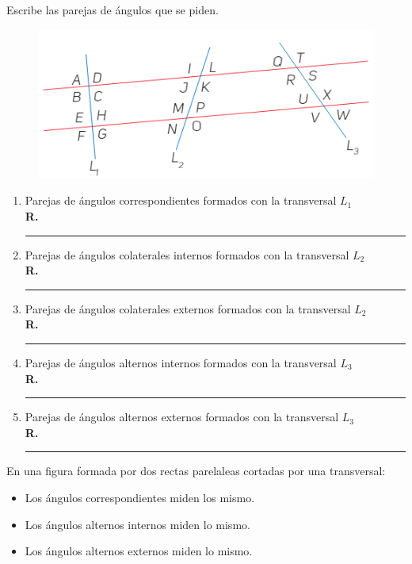 Escribe las parejas de ángulos que se piden.
\begin{figure}[H]
    \centering
    \includegraphics[scale=1]{Imagenes/Angulos_04.png}
\end{figure}
\begin{enumerate}[label=\alph*)]
\item Parejas de ángulos correspondientes formados con la transversal $L_{1}$ 
\\  \textbf{R. } \rule{2cm}{0.1mm}
\item Parejas de ángulos colaterales internos formados con la transversal $L_{2}$ 
\\  \textbf{R. } \rule{2cm}{0.1mm}
\item Parejas de ángulos colaterales externos formados con la transversal $L_{2}$ 
\\  \textbf{R. } \rule{2cm}{0.1mm}
\item Parejas de ángulos alternos internos formados con la transversal $L_{3}$ 
\\  \textbf{R. } \rule{2cm}{0.1mm}
\item Parejas de ángulos alternos externos formados con la transversal $L_{3}$ 
\\  \textbf{R. } \rule{2cm}{0.1mm}
\end{enumerate}

\newpage

En una figura formada por dos rectas parelaleas cortadas por una transversal:
\begin{itemize}
\item Los ángulos correspondientes miden los mismo.
\item Los ángulos alternos internos miden lo mismo.
\item Los ángulos alternos externos miden lo mismo.
\end{itemize}

